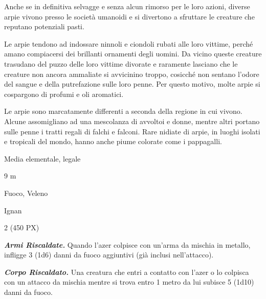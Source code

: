 \begin{multicols}{2}
{Anche se in definitiva selvagge e senza alcun rimorso per le loro azioni, diverse arpie vivono presso le società umanoidi e si divertono a sfruttare le creature che reputano potenziali pasti.

Le arpie tendono ad indossare ninnoli e ciondoli rubati alle loro vittime, perché amano compiacersi dei brillanti ornamenti degli uomini. Da vicino queste creature trasudano del puzzo delle loro vittime divorate e raramente lasciano che le creature non ancora ammaliate si avvicinino troppo, cosicché non sentano l'odore del sangue e della putrefazione sulle loro penne. Per questo motivo, molte arpie si cospargono di profumi e oli aromatici.

Le arpie sono marcatamente differenti a seconda della regione in cui vivono. Alcune assomigliano ad una mescolanza di avvoltoi e donne, mentre altri portano sulle penne i tratti regali di falchi e falconi. Rare nidiate di arpie, in luoghi isolati e tropicali del mondo, hanno anche piume colorate come i pappagalli.

\begin{description}[noitemsep, topsep=0pt, parsep=0pt, partopsep=0pt, itemsep=1pt, leftmargin=2.35cm,  labelwidth=2.2cm, itemindent=0cm, listparindent=0pt] %
\setlength{\baselineskip}{10pt}
\item[\textbf{Taglia/Tipo}] Media elementale, legale
\item[\textbf{Caratt.}] 
\item[\textbf{Punti Ferita}] 
\item[\textbf{Movimento}] 9 m
\item[\textbf{Tiri Salvez.}] 
\item[\textbf{Imm. Danni}] Fuoco, Veleno
\item[\textbf{Linguaggi}] Ignan
\item[\textbf{Sfida}] 2 (450 PX)
\end{description}
\smallskip

\emph{\textbf{Armi Riscaldate.}} Quando l'azer colpisce con un'arma da mischia in metallo, infligge 3 (1d6) danni da fuoco aggiuntivi (già inclusi nell'attacco).

\emph{\textbf{Corpo Riscaldato.}} Una creatura che entri a contatto con l'azer o lo colpisca con un attacco da mischia mentre si trova entro 1 metro da lui subisce 5 (1d10) danni da fuoco.

}
\end{multicols}

